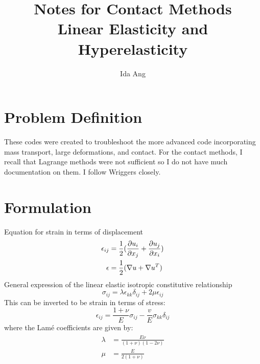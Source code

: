 \documentclass[12pt,3p]{article}
\numberwithin{equation}{section}
\begin{document}
\title{Notes for Contact Methods \\
	\large{Linear Elasticity and Hyperelasticity}}
\author{Ida Ang}
\date{\vspace{-5ex}}
\maketitle

\tableofcontents
\newpage

\section{Problem Definition}
These codes were created to troubleshoot the more advanced code incorporating mass transport, large deformations, and contact. For the contact methods, I recall that Lagrange methods were not sufficient so I do not have much documentation on them. I follow Wriggers closely. 

\section{Formulation}
Equation for strain in terms of displacement
\begin{align}\label{Strain}
\begin{split}
\epsilon_{ij} &= \frac{1}{2} (\pdv{u_i}{x_j} + \pdv{u_j}{x_i}) \\
 \epsilon &= \frac{1}{2} (\nabla u + \nabla u^T)
\end{split}
\end{align}
General expression of the linear elastic isotropic constitutive relationship 
\begin{equation}\label{StressStrain}
\sigma_{ij} = \lambda \epsilon_{kk} \delta_{ij} + 2 \mu \epsilon_{ij}
\end{equation}
This can be inverted to be strain in terms of stress: 
\begin{equation}\label{StrainStress}
\epsilon_{ij} = \frac{1+ \nu}{E} \sigma_{ij} - \frac{v}{E} \sigma_{kk} \delta_{ij}
\end{equation}
where the Lamé coefficients are given by: 
\begin{align}\label{lame}
\begin{split}
\lambda &= \frac{E \nu}{(1+ \nu) (1 - 2 \nu)} \\
\mu &= \frac{E}{2 (1+ \nu)}
\end{split}
\end{align}
\end{document}
